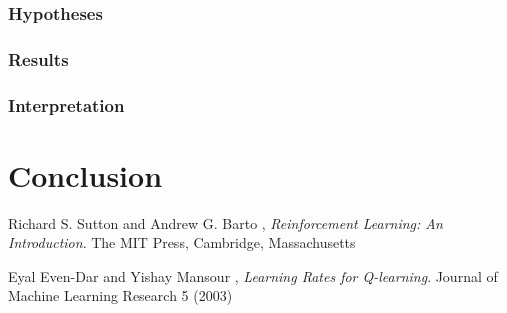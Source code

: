 \documentclass[11pt]{article}
\begin{document}
\subsubsection{Hypotheses}


\subsubsection{Results}


\subsubsection{Interpretation}


\subsubsection{}

\section{Conclusion}

\begin{thebibliography}{9}

  Richard S. Sutton and Andrew G. Barto ,
  \emph{Reinforcement Learning: An Introduction}.
  The MIT Press, Cambridge, Massachusetts

  Eyal Even-Dar and Yishay Mansour ,
  \emph{Learning Rates for Q-learning}.
  Journal of Machine Learning Research 5 (2003)

\end{thebibliography}
\end{document}
